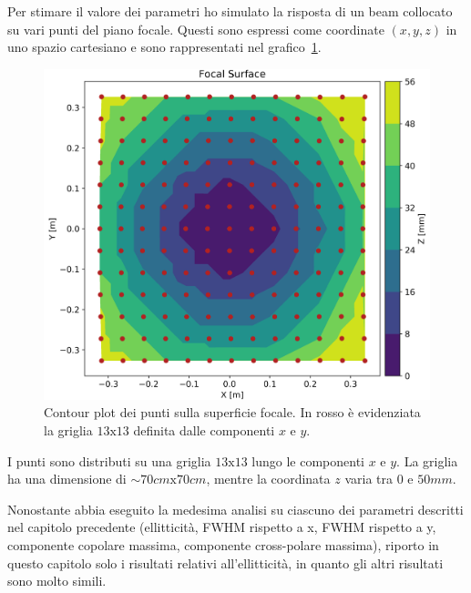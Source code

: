 \documentclass[12pt,a4paper,final]{book}
\begin{document}
Per stimare il valore dei parametri ho simulato la risposta di un beam collocato su vari punti del piano focale. Questi sono espressi come coordinate $(x,y,z)$ in uno spazio cartesiano e sono rappresentati nel grafico~\ref{cplot_fs}.
\begin{figure}[!ht]
	\centering
	\includegraphics[scale=0.6]{../figures/ContourPlot_z.png}
	\caption{Contour plot dei punti sulla superficie focale. In rosso è evidenziata la griglia $13\text{x}13$ definita dalle componenti $x$ e $y$.}
	\label{cplot_fs}
\end{figure}
I punti sono distributi su una griglia $13\text{x}13$ lungo le componenti $x$ e $y$. La griglia ha una dimensione di $\sim 70 \unit{cm}\text{x}70 \unit{cm}$, mentre la coordinata $z$ varia tra $0$ e $50 \unit{mm}$.


Nonostante abbia eseguito la medesima analisi su ciascuno dei parametri descritti nel capitolo precedente (ellitticità, FWHM rispetto a x, FWHM rispetto a y, componente copolare massima, componente cross-polare massima), riporto in questo capitolo solo i risultati relativi all'ellitticità, in quanto gli altri risultati sono molto simili.
\end{document}
